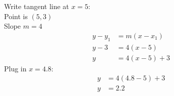 \documentclass[12pt,letterpaper, onecolumn]{exam}
\begin{document}
\begin{questions}
\begin{solution}
	Write tangent line at $x=5$: \\
	Point is $(5,3)$ \\
	Slope $m=4$ \\
	\begin{align}
		y-y_{1} &= m(x-x_1) \\
		y-3 &= 4(x-5) \\
		y &= 4(x-5) + 3
	\end{align}
	Plug in $x=4.8$:
	\begin{align}
		y &= 4(4.8-5) + 3 \\
		y &= \boxed{2.2}
	\end{align}
\end{solution}

\end{questions}
\end{document}
